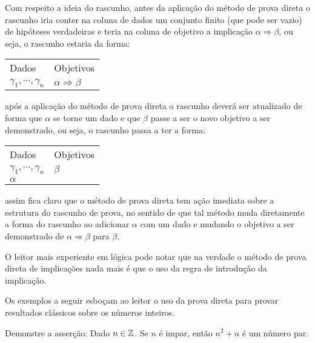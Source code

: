 Com respeito a ideia do rascunho, antes da aplicação do método de prova direta o rascunho iria conter na coluna de dados um conjunto finito (que pode ser vazio) de hipóteses verdadeiras e teria na coluna de objetivo a implicação $\alpha \Rightarrow \beta$, ou seja, o rascunho estaria da forma:

\begin{flushleft}
	\begin{tabular}{ll}
		Dados & Objetivos \\
		$\gamma_1, \cdots, \gamma_n$ & $\alpha\Rightarrow\beta$
	\end{tabular}
\end{flushleft}
\noindent após a aplicação do método de prova direta o rascunho deverá ser atualizado de forma que $\alpha$ se torne um dado e que $\beta$ passe a ser o novo objetivo a ser demonstrado, ou seja, o rascunho passa a ter a forma: 

\begin{flushleft}
	\begin{tabular}{ll}
		Dados & Objetivos \\
		$\gamma_1, \cdots, \gamma_n$ & $\beta$\\
		$\alpha$
	\end{tabular}
\end{flushleft}
\noindent assim fica claro que o método de prova direta tem ação imediata sobre a estrutura do rascunho de prova, no sentido de que tal método muda diretamente a forma do rascunho ao adicionar $\alpha$ com um dado e mudando o objetivo a ser demonstrado de $\alpha \Rightarrow \beta$ para $\beta$.

\begin{remark}
	O leitor mais experiente em lógica pode notar que na verdade o método de prova direta de implicações nada mais é que o uso da regra de introdução da implicação.
\end{remark}

Os exemplos a seguir esboçam ao leitor o uso da prova direta para provar resultados clássicos sobre os números inteiros.

\begin{problem}
	Demonstre a asserção: Dado $n \in \mathbb{Z}$. Se $n$ é impar, então $n^2 + n$ é um número par.
\end{problem}
